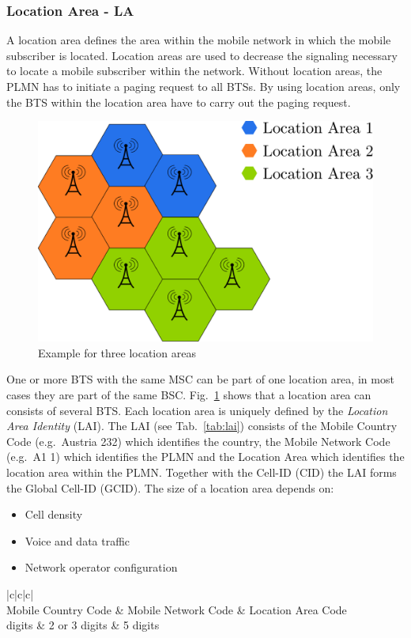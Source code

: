\documentclass[master,english]{hgbthesis}
\begin{document}
\subsubsection{Location Area - LA}
A location area defines the area within the mobile network in which the mobile subscriber is located. Location areas are used to decrease the signaling necessary to locate a mobile subscriber within the network. Without location areas, the PLMN has to initiate a paging request to all BTSs. By using location areas, only the BTS within the location area have to carry out the paging request.
% 
\begin{figure}
	\centering
	\includegraphics[width=0.7\linewidth]{./images/locationarea}
	\caption{Example for three location areas} 
	\label{fig:locationarea}
\end{figure}
One or more BTS with the same MSC can be part of one location area, in most cases they are part of the same BSC. Fig.\ \ref{fig:locationarea} shows that a location area can consists of several BTS. Each location area is uniquely defined by the \emph{Location Area Identity} (LAI). The LAI (see Tab.\ \ref{tab:lai}) consists of the Mobile Country Code (e.g.\ Austria 232) which identifies the country, the Mobile Network Code (e.g.\ A1 1) which identifies the PLMN and the Location Area which identifies the location area within the PLMN. Together with the Cell-ID (CID) the LAI forms the Global Cell-ID (GCID). 
The size of a location area depends on:
\begin{itemize}
	\item Cell density
	\item Voice and data traffic
	\item Network operator configuration
\end{itemize}
\begin{table}
	\begin{tabular}{|c|c|c|}
		\hline  {} \\ 
		\hline Mobile Country Code & Mobile Network Code & Location Area Code \\ 
		 digits            & 2 or 3 digits       & 5 digits           \\ 
		\hline 
	\end{tabular}
	\caption{Parts of the Location Area Identity }
	\label{tab:lai}
\end{table}
\end{document}
